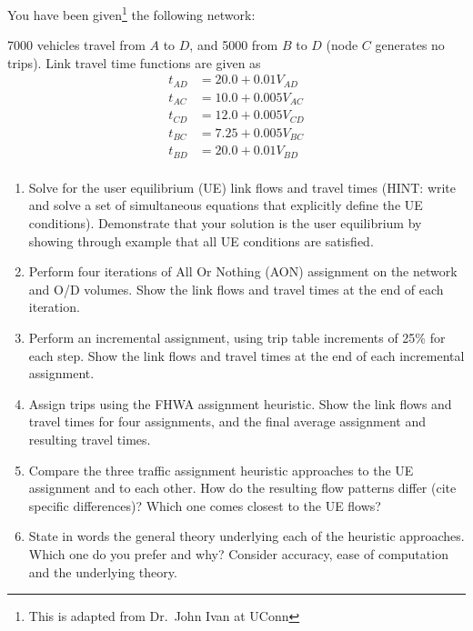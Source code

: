 
You have been given\footnote{This is adapted from Dr.\ John Ivan at UConn} the following network:
\begin{center}
\end{center}

7000 vehicles travel from $A$ to $D$, and 5000 from $B$ to $D$ (node $C$
generates no trips). Link travel time functions are given as 
\begin{align*}
t_{AD}& = 20.0 + 0.01 V_{AD}\\
t_{AC}& = 10.0 + 0.005 V_{AC}\\
t_{CD}& = 12.0 + 0.005 V_{CD}\\
t_{BC}& = 7.25 + 0.005 V_{BC}\\
t_{BD}& = 20.0 + 0.01 V_{BD}\\
\end{align*}

\begin{enumerate}
\item{Solve for the user equilibrium (UE) link flows and travel times (HINT: write and 
solve a set of simultaneous equations that explicitly define the UE conditions). 
Demonstrate that your solution is the user equilibrium by showing through 
example that all UE conditions are satisfied.}

\item{Perform four iterations of All Or Nothing (AON) assignment on the network and 
O/D volumes. Show the link flows and travel times at the end of each iteration.}

\item{Perform an incremental assignment, using trip table increments of 25\% for each 
step. Show the link flows and travel times at the end of each incremental 
assignment.}

\item{Assign trips using the FHWA assignment heuristic. Show the link flows and 
travel times for four assignments, and the final average assignment and resulting 
travel times.}

\item{Compare the three traffic assignment heuristic approaches to the UE assignment 
and to each other. How do the resulting flow patterns differ (cite specific 
differences)? Which one comes closest to the UE flows?}

\item{State in words the general theory underlying each of the heuristic approaches. 
Which one do you prefer and why? Consider accuracy, ease of computation and 
the underlying theory.}
\end{enumerate}



